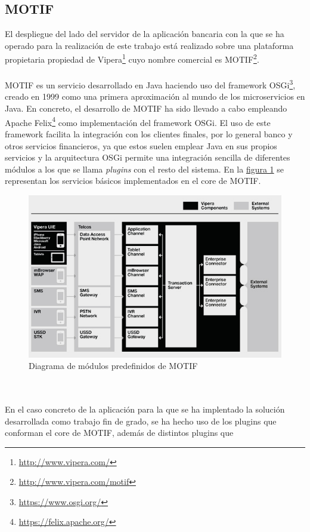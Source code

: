 \documentclass[a4paper, 12pt]{article}
\begin{document}
\subsection{MOTIF}
\label{sec-2-2}
El despliegue del lado del servidor de la aplicación bancaria con la que se ha operado
para la realización de este trabajo está realizado sobre una plataforma propietaria propiedad
de Vipera\footnote{\url{http://www.vipera.com/}} cuyo nombre comercial es MOTIF\footnote{\url{http://www.vipera.com/motif}}.
\\
\\
MOTIF es un servicio desarrollado en Java haciendo uso del framework OSGi\footnote{\url{https://www.osgi.org/}}, creado en 1999
como una primera aproximación al mundo de los microservicios en Java. En concreto, el desarrollo de MOTIF
ha sido llevado a cabo empleando Apache Felix\footnote{\url{https://felix.apache.org/}} como implementación del framework OSGi. El uso de
este framework facilita la integración con los clientes finales, por lo general banco y otros servicios
financieros, ya que estos suelen emplear Java en sus propios servicios y la arquitectura OSGi permite una
integración sencilla de diferentes módulos a los que se llama \emph{plugins} con el resto del sistema. En la \hyperref[fig:motif-core]{figura 1}
se representan los servicios básicos implementados en el core de MOTIF.
\begin{figure}[htb]
\centering
\includegraphics[width=.9\linewidth]{./images/motif.jpg}
\caption{\label{fig:motif-core}Diagrama de módulos predefinidos de MOTIF}
\end{figure}
\\
\\
En el caso concreto de la aplicación para la que se ha implentado la solución desarrollada como trabajo
fin de grado, se ha hecho uso de los plugins que conforman el core de MOTIF, además de distintos plugins que
\end{document}
